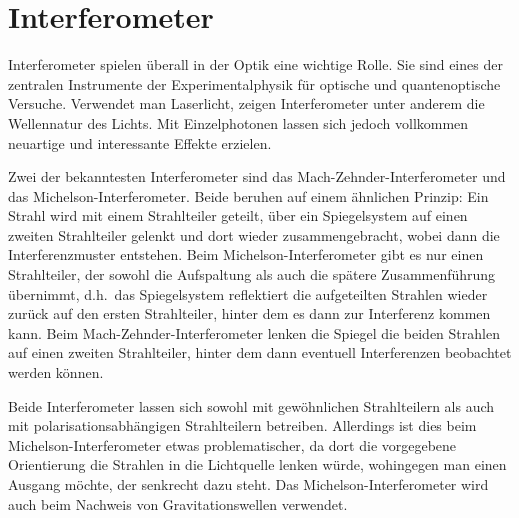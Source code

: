 
\chapter{Interferometer}
\label{chap_Interferometer}

Interferometer spielen \"uberall in der Optik eine wichtige Rolle. 
Sie sind eines
der zentralen Instrumente der Experimentalphysik f\"ur optische und quantenoptische Versuche. Verwendet man
Laserlicht, zeigen Interferometer unter anderem die Wellennatur des Lichts. Mit Einzelphotonen
lassen sich jedoch vollkommen neuartige und interessante Effekte erzielen. 

Zwei der bekanntesten Interferometer sind das Mach-Zehnder-Interferometer und
das Michelson-Interferometer. Beide beruhen auf einem \"ahnlichen Prinzip: Ein Strahl
wird mit einem Strahlteiler geteilt, \"uber ein Spiegelsystem auf einen zweiten Strahlteiler gelenkt
und dort wieder zusammengebracht, wobei dann die Interferenzmuster entstehen. Beim Michelson-Interferometer
gibt es nur einen Strahlteiler, der sowohl die Aufspaltung als auch die sp\"atere
Zusammenf\"uhrung \"ubernimmt, d.h.\ das Spiegelsystem reflektiert die aufgeteilten 
Strahlen wieder zur\"uck auf den ersten Strahlteiler, hinter dem es dann zur Interferenz kommen kann. Beim 
Mach-Zehnder-Interferometer lenken die Spiegel die beiden Strahlen auf einen
zweiten Strahlteiler, hinter dem dann eventuell Interferenzen beobachtet werden k\"onnen.  


Beide Interferometer lassen sich sowohl mit gew\"ohnlichen Strahlteilern als auch
mit polarisationsabh\"angigen Strahlteilern betreiben. Allerdings ist dies beim Michelson-Interferometer
etwas problematischer, da dort die vorgegebene Orientierung die Strahlen in die Lichtquelle
lenken w\"urde, wohingegen man einen Ausgang m\"ochte, der senkrecht dazu steht. 
Das Michelson-Interferometer wird auch beim Nachweis von Gravitationswellen verwendet. 

